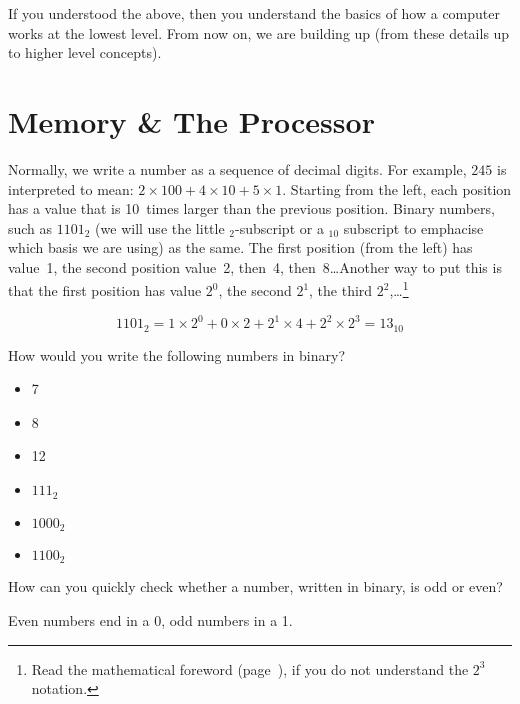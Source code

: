 If you understood the above, then you understand the basics of how a computer
works at the lowest level. From now on, we are building up (from these details
up to higher level concepts).

\section{Memory \& The Processor}

Normally, we write a number as a sequence of decimal digits. For example, $245$
is interpreted to mean: $2 \times 100 + 4 \times 10 + 5 \times 1$. Starting
from the left, each position has a value that is 10~times larger than the
previous position. Binary numbers, such as $1101_2$ (we will use the little
$_2$-subscript or a $_{10}$ subscript to emphacise which basis we are using) as
the same. The first position (from the left) has value~1, the second position
value~2, then~4, then~8\ldots Another way to put this is that the first
position has value $2^0$, the second $2^1$, the third
$2^2$,\ldots\footnote{Read the mathematical foreword
(page~\pageref{chpt:mathforeword}), if you do not understand the $2^3$
notation.}

\[
1101_2 = 1 \times 2^{0}  + 0 \times 2 + 2^1 \times 4 + 2^2 \times 2^3 = 13_{10}
\]

\begin{exercise}
How would you write the following numbers in binary?

\begin{itemize}
\item 7
\item 8
\item 12
\end{itemize}
\begin{solution}
\begin{itemize}
\item $111_2$
\item $1000_2$
\item $1100_2$
\end{itemize}
\end{solution}
\end{exercise}

\begin{exercise}
How can you quickly check whether a number, written in binary, is odd or even?
\begin{solution}
Even numbers end in a 0, odd numbers in a 1.
\end{solution}
\end{exercise}

